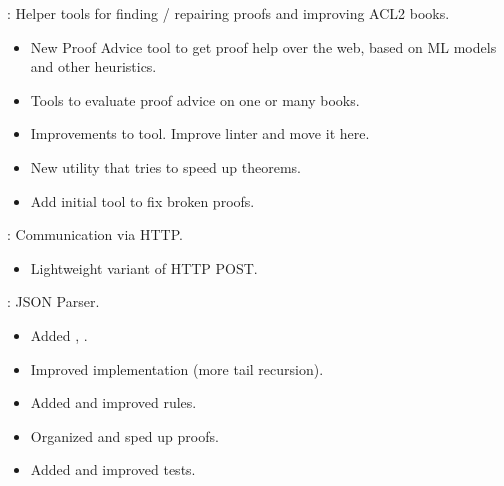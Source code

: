 \begin{frame}

\implibtitle

:
Helper tools for finding / repairing proofs and improving ACL2 books.
\begin{itemize}
\item New Proof Advice tool to get proof help over the web, based on ML models and other heuristics.
\item Tools to evaluate proof advice on one or many books.
\item Improvements to  tool.  Improve linter and move it here.
\item New  utility that tries to speed up theorems.
\item Add initial  tool to fix broken proofs.
\end{itemize}

\end{frame}


\begin{frame}

\implibtitle

:
Communication via HTTP.
\begin{itemize}
\item Lightweight variant of HTTP POST.
\end{itemize}

\end{frame}


\begin{frame}

\implibtitle

:
JSON Parser.
\begin{itemize}
\item Added , .
\item Improved implementation (more tail recursion).
\item Added and improved rules.
\item Organized and sped up proofs.
\item Added and improved tests.
\end{itemize}

\end{frame}


